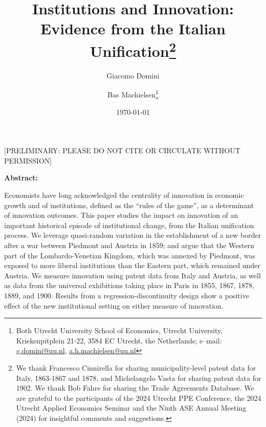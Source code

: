 

\title{Institutions and Innovation: \\ Evidence from the Italian Unification\footnote{We thank Francesco Cinnirella for sharing municipality-level patent data for Italy, 1863-1867 and 1878, and Michelangelo Vasta for sharing patent data for 1902. We thank Bob Fahre for sharing the Trade Agreements Database.
We are grateful to the participants of the 2024 Utrecht PPE Conference, the 2024 Utrecht Applied Economics Seminar and the Ninth ASE Annual Meeting (2024) for insightful comments and suggestions. 
}
}
\author{Giacomo Domini \and Bas Machielsen\footnote{Both Utrecht University School of Economics, Utrecht University, Kriekenpitplein 21-22, 3584 EC Utrecht, the Netherlands; e--mail: \href{mailto:g.domini@uu.nl}{g.domini@uu.nl}, \href{mailto:a.h.machielsen@uu.nl}{a.h.machielsen@uu.nl}}}
\date{\today}



\maketitle


\vspace{1 cm}

\begin{center} 
[PRELIMINARY: PLEASE DO NOT CITE OR CIRCULATE WITHOUT PERMISSION]

\vspace{1 cm}

\textbf{Abstract:} 
\end{center}

\noindent Economists have long acknowledged the centrality of innovation in economic growth and of institutions, defined as the “rules of the game”, as a determinant of innovation outcomes. 
This paper studies the impact on innovation of an important historical episode of institutional change, from the Italian unification process. 
We leverage quasi-random variation in the establishment of a new border after a war between Piedmont and Austria in 1859; and argue that the Western part of the Lombardo-Venetian Kingdom, which was annexed by Piedmont, was exposed to more liberal institutions than the Eastern part, which remained under Austria. 
We measure innovation using  patent data from Italy and Austria, as well as data from the universal exhibitions taking place in Paris in 1855, 1867, 1878, 1889, and 1900. 
Results from a regression-discontinuity design show a positive effect of the new institutional setting on either measure of innovation.

